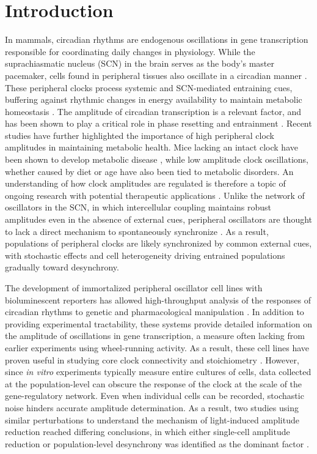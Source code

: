 \documentclass[11pt, letterpaper]{article}
\begin{document}
\section*{Introduction}
In mammals, circadian rhythms are endogenous oscillations in gene transcription responsible for coordinating daily changes in physiology.
While the suprachiasmatic nucleus (SCN) in the brain serves as the body's master pacemaker, cells found in peripheral tissues also oscillate in a circadian manner \cite{Lamia2008}.
These peripheral clocks process systemic and SCN-mediated entraining cues, buffering against rhythmic changes in energy availability to maintain metabolic homeostasis \cite{Kornmann2007}.
The amplitude of circadian transcription is a relevant factor, and has been shown to play a critical role in phase resetting and entrainment \cite{Pittendrigh1991, Abraham2010}.
Recent studies have further highlighted the importance of high peripheral clock amplitudes in maintaining metabolic health.
Mice lacking an intact clock have been shown to develop metabolic disease \cite{Marcheva2010}, while low amplitude clock oscillations, whether caused by diet \cite{Hatori2012} or age \cite{Chang2013} have also been tied to metabolic disorders.
An understanding of how clock amplitudes are regulated is therefore a topic of ongoing research with potential therapeutic applications \cite{St.John2014}.
 Unlike the network of oscillators in the SCN, in which intercellular coupling maintains robust amplitudes even in the absence of external cues, peripheral oscillators are thought to lack a direct mechanism to spontaneously synchronize \cite{Welsh2004}.
As a result, populations of peripheral clocks are likely synchronized by common external cues, with stochastic effects and cell heterogeneity driving entrained populations gradually toward desynchrony.

The development of immortalized peripheral oscillator cell lines with bioluminescent reporters has allowed high-throughput analysis of the responses of circadian rhythms to genetic and pharmacological manipulation \cite{Hirota2010, Ramanathan2014}.
In addition to providing experimental tractability, these systems provide detailed information on the amplitude of oscillations in gene transcription, a measure often lacking from earlier experiments using wheel-running activity.
 As a result, these cell lines have proven useful in studying core clock connectivity and stoichiometry \cite{Baggs2009}.
However, since {\itshape in vitro} experiments typically measure entire cultures of cells, data collected at the population-level can obscure the response of the clock at the scale of the gene-regulatory network.
Even when individual cells can be recorded, stochastic noise hinders accurate amplitude determination.
As a result, two studies using similar perturbations to understand the mechanism of light-induced amplitude reduction reached differing conclusions, in which either single-cell amplitude reduction or population-level desynchrony was identified as the dominant factor \cite{Pulivarthy2007, Ukai2007}.
\end{document}
